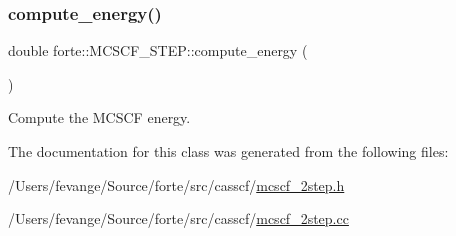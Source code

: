 \subsubsection{\texorpdfstring{compute\+\_\+energy()}{compute\_energy()}}
{\footnotesize\ttfamily double forte\+::\+M\+C\+S\+C\+F\+\_\+S\+T\+E\+P\+::compute\+\_\+energy (\begin{DoxyParamCaption}{ }\end{DoxyParamCaption})}



Compute the M\+C\+S\+CF energy. 



The documentation for this class was generated from the following files\+:\begin{DoxyCompactItemize}
\item 
/\+Users/fevange/\+Source/forte/src/casscf/\mbox{\hyperlink{mcscf__2step_8h}{mcscf\+\_\+2step.\+h}}\item 
/\+Users/fevange/\+Source/forte/src/casscf/\mbox{\hyperlink{mcscf__2step_8cc}{mcscf\+\_\+2step.\+cc}}\end{DoxyCompactItemize}
